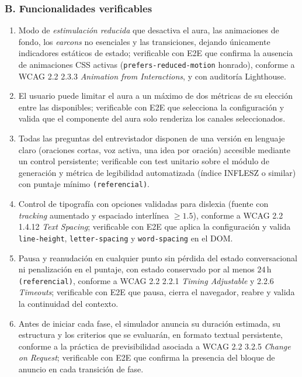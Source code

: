 \subsubsection*{B. Funcionalidades verificables}
\begin{enumerate}
  \item Modo de \emph{estimulación reducida} que desactiva el aura, las
        animaciones de fondo, los \textit{earcons} no esenciales y las
        transiciones, dejando únicamente indicadores estáticos de
        estado; verificable con E2E que confirma la ausencia de
        animaciones CSS activas (\texttt{prefers-reduced-motion}
        honrado), conforme a WCAG 2.2 2.3.3 \textit{Animation from
        Interactions}, y con auditoría Lighthouse.
  \item El usuario puede limitar el aura a un máximo de dos métricas
        de su elección entre las disponibles; verificable con E2E que
        selecciona la configuración y valida que el componente del
        aura solo renderiza los canales seleccionados.
  \item Todas las preguntas del entrevistador disponen de una versión
        en lenguaje claro (oraciones cortas, voz activa, una idea por
        oración) accesible mediante un control persistente; verificable
        con test unitario sobre el módulo de generación y métrica de
        legibilidad automatizada (índice INFLESZ o similar) con puntaje
        mínimo \texttt{(referencial)}.
  \item Control de tipografía con opciones validadas para dislexia
        (fuente con \textit{tracking} aumentado y espaciado interlínea
        $\ge 1.5$), conforme a WCAG 2.2 1.4.12 \textit{Text Spacing};
        verificable con E2E que aplica la configuración y valida
        \texttt{line-height}, \texttt{letter-spacing} y
        \texttt{word-spacing} en el DOM.
  \item Pausa y reanudación en cualquier punto sin pérdida del estado
        conversacional ni penalización en el puntaje, con estado
        conservado por al menos $24\,\mathrm{h}$ \texttt{(referencial)},
        conforme a WCAG 2.2 2.2.1 \textit{Timing Adjustable} y 2.2.6
        \textit{Timeouts}; verificable con E2E que pausa, cierra el
        navegador, reabre y valida la continuidad del contexto.
  \item Antes de iniciar cada fase, el simulador anuncia su duración
        estimada, su estructura y los criterios que se evaluarán, en
        formato textual persistente, conforme a la práctica de
        previsibilidad asociada a WCAG 2.2 3.2.5 \textit{Change on
        Request}; verificable con E2E que confirma la presencia del
        bloque de anuncio en cada transición de fase.
\end{enumerate}

